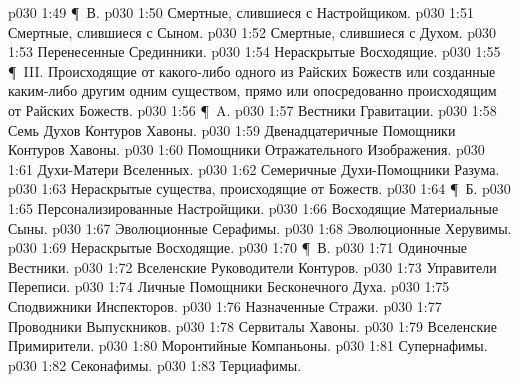 \vs p030 1:49 \P\ В. 
\vs p030 1:50 \bibnobreakspace Смертные, слившиеся с Настройщиком.
\vs p030 1:51 \bibnobreakspace Смертные, слившиеся с Сыном.
\vs p030 1:52 \bibnobreakspace Смертные, слившиеся с Духом.
\vs p030 1:53 \bibnobreakspace Перенесенные Срединники.
\vs p030 1:54 \bibnobreakspace Нераскрытые Восходящие.
\vs p030 1:55 \P\ III.  Происходящие от какого\hyp{}либо одного из Райских Божеств или созданные каким\hyp{}либо другим одним существом, прямо или опосредованно происходящим от Райских Божеств.
\vs p030 1:56 \P\ A. 
\vs p030 1:57 \bibnobreakspace Вестники Гравитации.
\vs p030 1:58 \bibnobreakspace Семь Духов Контуров Хавоны.
\vs p030 1:59 \bibnobreakspace Двенадцатеричные Помощники Контуров Хавоны.
\vs p030 1:60 \bibnobreakspace Помощники Отражательного Изображения.
\vs p030 1:61 \bibnobreakspace Духи\hyp{}Матери Вселенных.
\vs p030 1:62 \bibnobreakspace Семеричные Духи\hyp{}Помощники Разума.
\vs p030 1:63 \bibnobreakspace Нераскрытые существа, происходящие от Божеств.
\vs p030 1:64 \P\ Б. 
\vs p030 1:65 \bibnobreakspace Персонализированные Настройщики.
\vs p030 1:66 \bibnobreakspace Восходящие Материальные Сыны.
\vs p030 1:67 \bibnobreakspace Эволюционные Серафимы.
\vs p030 1:68 \bibnobreakspace Эволюционные Херувимы.
\vs p030 1:69 \bibnobreakspace Нераскрытые Восходящие.
\vs p030 1:70 \P\ В. 
\vs p030 1:71 \bibnobreakspace Одиночные Вестники.
\vs p030 1:72 \bibnobreakspace Вселенские Руководители Контуров.
\vs p030 1:73 \bibnobreakspace Управители Переписи.
\vs p030 1:74 \bibnobreakspace Личные Помощники Бесконечного Духа.
\vs p030 1:75 \bibnobreakspace Сподвижники Инспекторов.
\vs p030 1:76 \bibnobreakspace Назначенные Стражи.
\vs p030 1:77 \bibnobreakspace Проводники Выпускников.
\vs p030 1:78 \bibnobreakspace Сервиталы Хавоны.
\vs p030 1:79 \bibnobreakspace Вселенские Примирители.
\vs p030 1:80 \bibnobreakspace Моронтийные Компаньоны.
\vs p030 1:81 \bibnobreakspace Супернафимы.
\vs p030 1:82 \bibnobreakspace Секонафимы.
\vs p030 1:83 \bibnobreakspace Терциафимы.
